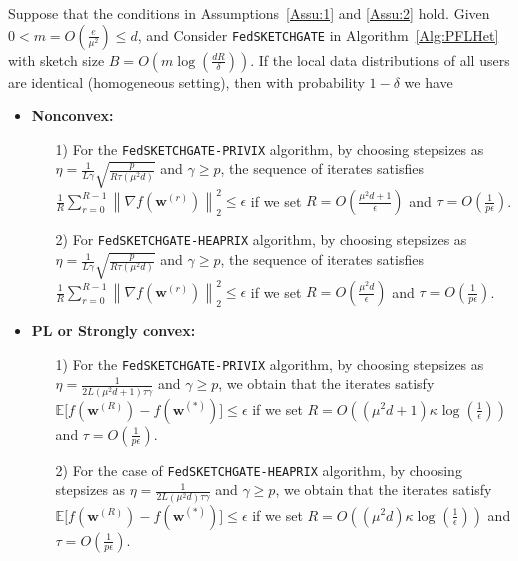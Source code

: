\begin{theorem}\label{thm:hetreg_case}
  Suppose that the conditions in Assumptions~\ref{Assu:1} and \ref{Assu:2} hold. Given $0<m=O\left(\frac{e}{\mu^2}\right)\leq d$, and Consider \texttt{FedSKETCHGATE} in Algorithm~\ref{Alg:PFLHet} with sketch size $B=O\left(m\log\left(\frac{d R}{\delta}\right)\right)$. If the local data distributions of all users are identical (homogeneous setting), then with probability $1-\delta$ we have  
 \begin{itemize}
     \item \textbf{Nonconvex:}  
     \begin{itemize}
         \item [1)] For the \texttt{FedSKETCHGATE-PRIVIX} algorithm, by choosing stepsizes as $\eta=\frac{1}{L\gamma}\sqrt{\frac{p}{R\tau\left(\mu^2d\right)}}$ and $\gamma\geq p$, the sequence of iterates satisfies  $\frac{1}{R}\sum_{r=0}^{R-1}\left\|\nabla f({\boldsymbol{w}}^{(r)})\right\|_2^2\leq {\epsilon}$ if we set
     $R=O\left(\frac{\mu^2d+1}{\epsilon}\right)$ and $ \tau=O\left(\frac{1}{{p}\epsilon}\right)$.
         \item[2)] For \texttt{FedSKETCHGATE-HEAPRIX} algorithm, by choosing stepsizes as $\eta=\frac{1}{L\gamma}\sqrt{\frac{p}{R\tau\left(\mu^2d\right)}}$ and $\gamma\geq p$, the sequence of iterates satisfies  $\frac{1}{R}\sum_{r=0}^{R-1}\left\|\nabla f({\boldsymbol{w}}^{(r)})\right\|_2^2\leq {\epsilon}$ if we set
     $R=O\left(\frac{\mu^2d}{\epsilon}\right)$ and $ \tau=O\left(\frac{1}{{p}\epsilon}\right)$. 
     \end{itemize}
     
     \item \textbf{PL or Strongly convex:}
      \begin{itemize}
          \item[1)] For the \texttt{FedSKETCHGATE-PRIVIX} algorithm, by choosing stepsizes as $\eta=\frac{1}{2L\left({\mu^2d}+1\right)\tau\gamma}$ and $\gamma\geq p$, we obtain that the iterates satisfy $\mathbb{E}\Big[f({\boldsymbol{w}}^{(R)})-f({\boldsymbol{w}}^{(*)})\Big]\leq \epsilon$ if  we set
     $R=O\left(\left(\mu^2d+1\right)\kappa\log\left(\frac{1}{\epsilon}\right)\right)$ and $ \tau=O\left(\frac{1}{p\epsilon}\right)$.
          
          \item[2)] For the case of 
         \texttt{FedSKETCHGATE-HEAPRIX} algorithm,
by choosing stepsizes as $\eta=\frac{1}{2L\left(\mu^2d\right)\tau\gamma}$ and $\gamma\geq p$, we obtain that the iterates satisfy $\mathbb{E}\Big[f({\boldsymbol{w}}^{(R)})-f({\boldsymbol{w}}^{(*)})\Big]\leq \epsilon$ if  we set
     $R=O\left(\left(\mu^2d\right)\kappa\log\left(\frac{1}{\epsilon}\right)\right)$ and $ \tau=O\left(\frac{1}{p\epsilon}\right)$. 
      \end{itemize}
      

\end{itemize}
\end{theorem}
